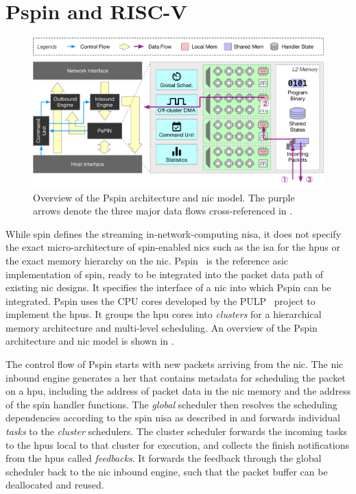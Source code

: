 \section{P\acs{spin} and RISC-V} \label{sec:background-pspin}

\begin{figure}[tp]
    \centering
    \includegraphics[width=\textwidth]{figures/pspin-arch.pdf}
    \caption{Overview of the P\acs{spin} architecture and \ac{nic} model.  The purple arrows denote the three major data flows cross-referenced in .} \label{fig:pspin-arch}
\end{figure}

While \ac{spin} defines the streaming in-network-computing \ac{nisa}, it does not specify the exact micro-architecture of \ac{spin}-enabled \ac{nic}s such as the \ac{isa} for the \ac{hpu}s or the exact memory hierarchy on the \ac{nic}.  P\acs{spin}~\cite{di_girolamo_pspin_2021} is the reference \ac{asic} implementation of \ac{spin}, ready to be integrated into the packet data path of existing \ac{nic} designs.  It specifies the interface of a \ac{nic} into which P\acs{spin} can be integrated.  P\acs{spin} uses the CPU cores developed by the PULP~\cite{rossi_pulp_2015} project to implement the \ac{hpu}s.  It groups the \ac{hpu} cores into \emph{clusters} for a hierarchical memory architecture and multi-level scheduling.  An overview of the P\acs{spin} architecture and \ac{nic} model is shown in .

The control flow of P\acs{spin} starts with new packets arriving from the \ac{nic}.  The \ac{nic} inbound engine generates a \ac{her} that contains metadata for scheduling the packet on a \ac{hpu}, including the address of packet data in the \ac{nic} memory and the address of the \ac{spin} handler functions.  The \emph{global} scheduler then resolves the scheduling dependencies according to the \ac{spin} \ac{nisa} as described in  and forwards individual \emph{tasks} to the \emph{cluster} schedulers.  The cluster scheduler forwards the incoming tasks to the \ac{hpu}s local to that cluster for execution, and collects the finish notifications from the \ac{hpu}s called \emph{feedbacks}.  It forwards the feedback through the global scheduler back to the \ac{nic} inbound engine, such that the packet buffer can be deallocated and reused.

